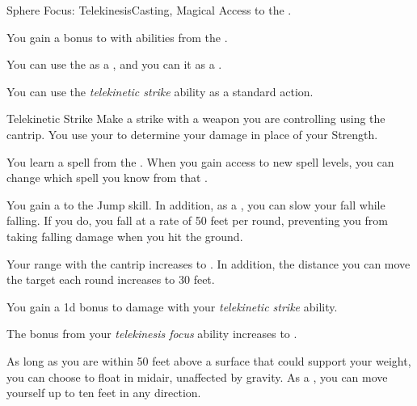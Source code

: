     \begin{feat}{Sphere Focus: Telekinesis}{Casting, Magical}
        \featpre Access to the  .

         You gain a  bonus to  with abilities from the  .

         You can use the   as a , and you can  it as a .

         You can use the \textit{telekinetic strike} ability as a standard action.
        \begin{freeability}{Telekinetic Strike}
            Make a strike with a weapon you are controlling using the  cantrip.
            You use your  to determine your damage in place of your Strength.
        \end{freeability}

         You learn a spell from the  .
        When you gain access to new spell levels, you can change which spell you know from that .

         You gain a   to the Jump skill.
        In addition, as a , you can slow your fall while falling.
        If you do, you fall at a rate of 50 feet per round, preventing you from taking falling damage when you hit the ground.

         Your range with the  cantrip increases to \rngmed.
        In addition, the distance you can move the target each round increases to 30 feet.

         You gain a \plus1d bonus to damage with your \textit{telekinetic strike} ability.

         The bonus from your \textit{telekinesis focus} ability increases to .

         As long as you are within 50 feet above a surface that could support your weight, you can choose to float in midair, unaffected by gravity.
        As a , you can move yourself up to ten feet in any direction.
    \end{feat}


